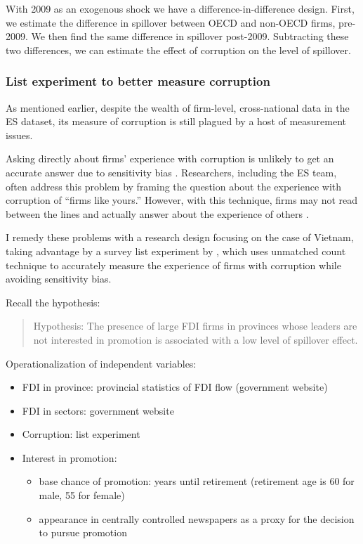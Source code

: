 With 2009 as an exogenous shock we have a difference-in-difference design. First, we estimate the difference in spillover between OECD and non-OECD firms, pre-2009. We then find the same difference in spillover post-2009. Subtracting these two differences, we can estimate the effect of corruption on the level of spillover.

\subsubsection*{List experiment to better measure corruption}

As mentioned earlier, despite the wealth of firm-level, cross-national data in the ES dataset, its measure of corruption is still plagued by a host of measurement issues. 

Asking directly about firms' experience with corruption is unlikely to get an accurate answer due to sensitivity bias \citep{Coutts2011}. Researchers, including the ES team, often address this problem by framing the question about the experience with corruption of ``firms like yours.'' However, with this technique, firms may not read between the lines and actually answer about the experience of others \citep{Ahart2004}.

I remedy these problems with a research design focusing on the case of Vietnam, taking advantage by a survey list experiment by \citet{Malesky2015}, which uses unmatched count technique to accurately measure the experience of firms with corruption while avoiding sensitivity bias.

Recall the hypothesis:

\begin{quote}
Hypothesis: The presence of large FDI firms in provinces whose leaders are not interested in promotion is associated with a low level of spillover effect.
\end{quote}

Operationalization of independent variables:
\begin{itemize}
\item FDI in province: provincial statistics of FDI flow (government website)
\item FDI in sectors: government website
\item Corruption: list experiment \citep{Malesky2015}
\item Interest in promotion: 
\begin{itemize}
	\item base chance of promotion: years until retirement (retirement age is 60 for male, 55 for female)
	\item appearance in centrally controlled newspapers as a proxy for the decision to pursue promotion
\end{itemize}
\end{itemize}

